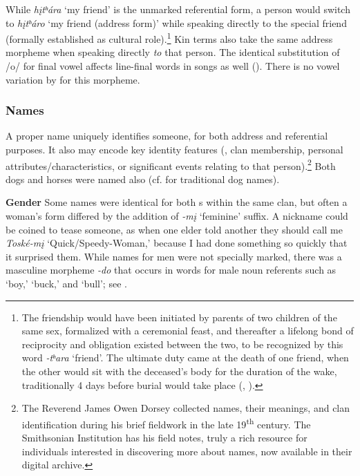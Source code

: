 \documentclass[output=paper]{LSP/langsci}
\begin{document}
While \textit{h\k{i}tʰára} `my friend' is the unmarked referential form, a person would switch to \textit{h\k{i}tʰáro} `my friend (address form)' while speaking directly to the special friend (formally established as cultural role).\footnote{The friendship would have been initiated by parents of two children of the same sex, formalized with a ceremonial feast, and thereafter a lifelong bond of reciprocity and obligation existed between the two, to be recognized by this word \textit{-tʰara} `friend'. The ultimate duty came at the death of one friend, when the other would sit with the deceased's body for the duration of the wake, traditionally 4 days before burial would take place (\citealt{Whitman1936}, \citealt{Davidson1997}).}  Kin terms also take the same address morpheme when speaking directly \textit{to} that person. The identical substitution of /o/ for  final vowel affects line-final words in songs as well (\citealt{Davidson1997}).  There is no vowel variation by  for this morpheme.         
  
\subsubsection{Names}  A proper name uniquely identifies someone, for both address and referential purposes. It also may encode key identity features (, clan membership, personal attributes/characteristics, or significant events relating to that person).\footnote{The Reverend James Owen Dorsey collected names, their meanings, and clan identification during his brief fieldwork in the late 19\textsuperscript{th} century. The Smithsonian Institution has his field notes, truly a rich resource for individuals interested in discovering more about names, now available in their digital archive.}  Both dogs and horses were named also (cf. \citealt{Whitman1936} for traditional  dog names).  

\textbf{Gender} Some names were identical for both s within the same clan, but often a woman's form differed by the addition of \textit{-m\k{i}} `feminine' suffix.  A nickname could be coined to tease someone, as when one elder told another they should call me \textit{Toské-m\k{i}} `Quick/Speedy-Woman,' because I had done something so quickly that it surprised them. While names for men were not specially marked, there was a masculine morpheme \textit{-do} that occurs in words for male noun referents such as `boy,' `buck,' and `bull'; see .  
\end{document}
